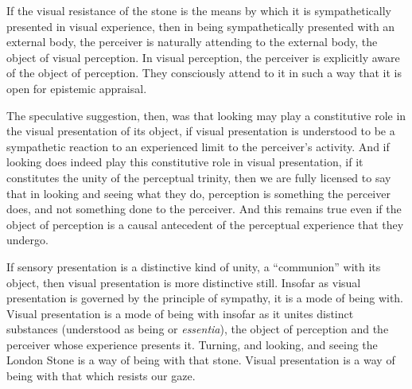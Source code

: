 \documentclass[12pt]{article}
\begin{document}
If the visual resistance of the stone is the means by which it is sympathetically presented in visual experience, then in being sympathetically presented with an external body, the perceiver is naturally attending to the external body, the object of visual perception. In visual perception, the perceiver is explicitly aware of the object of perception. They consciously attend to it in such a way that it is open for epistemic appraisal.

The speculative suggestion, then, was that looking may play a constitutive role in the visual presentation of its object, if visual presentation is understood to be a sympathetic reaction to an experienced limit to the perceiver's activity. And if looking does indeed play this constitutive role in visual presentation, if it constitutes the unity of the perceptual trinity, then we are fully licensed to say that in looking and seeing what they do, perception is something the perceiver does, and not something done to the perceiver. And this remains true even if the object of perception is a causal antecedent of the perceptual experience that they undergo.

If sensory presentation is a distinctive kind of unity, a ``communion'' with its object, then visual presentation is more distinctive still. Insofar as visual presentation is governed by the principle of sympathy, it is a mode of being with. Visual presentation is a mode of being with insofar as it unites distinct substances (understood as being or \emph{essentia}), the object of perception and the perceiver whose experience presents it. Turning, and looking, and seeing the London Stone is a way of being with that stone. Visual presentation is a way of being with that which resists our gaze.



\nocite{Broadie:1993dz}
\nocite{Hicks:1907uq}



\end{document}
